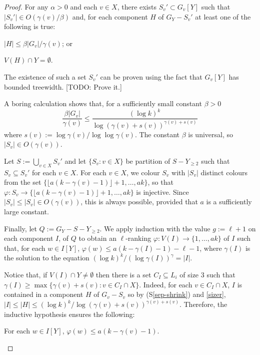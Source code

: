 \documentclass[kpfonts]{patmorin}
\theoremstyle{named}
\begin{document}
\begin{proof}
    For any $\alpha >0$ and each $v\in X$, there exists $S_v'\subset G_v[Y]$ such that $|S_v'|\in O(\gamma(v)/\beta)$ and, for each component $H$ of $G_Y-S_v'$ at least one of the following is true:
    \begin{compactenum}[(S1)]
        \item $|H|\le \beta|G_v|/\gamma(v)$; or \label{sep-shrink}
        \item $V(H)\cap Y=\emptyset$. \label{sep-biggies}
    \end{compactenum}
    The existence of such a set $S_v'$ can be proven using the fact that $G_v[Y]$ has bounded treewidth.  [TODO: Prove it.]

    A boring calculation shows that, for a sufficiently small constant $\beta>0$
    \begin{equation}
        \frac{\beta|G_v|}{\gamma(v)} \le \frac{(\log k)^k}{\log (\gamma(v)+s(v))^{\gamma(v)+s(v)}} \label{sizer}
    \end{equation}
    where $s(v):=\log\gamma(v)/\log\log\gamma(v)$. The constant $\beta$ is universal, so $|S_v|\in O(\gamma(v))$.

    Let $S:=\bigcup_{v\in X} S_v'$ and let $\{S_v: v\in X\}$ be partition of $S-Y_{\ge 2}$ such that $S_v\subseteq S_v'$ for each $v\in X$. For each $v\in X$, we colour $S_v$ with $|S_v|$ distinct colours from the set $\{\lfloor a(k-\gamma(v)-1)\rfloor+1,\ldots,ak\}$, so that $\varphi:S_v\to\{\lfloor a(k-\gamma(v)-1)\rfloor+1,\ldots,ak\}$ is injective.  Since $|S_v|\le |S_v|\in O(\gamma(v))$, this is always possible, provided that $a$ is a sufficiently large constant.

    Finally, let $Q:=G_Y-S-Y_{\ge 2}$.  We apply induction with the value $g:=\ell+1$ on each component $I$, of $Q$ to obtain an $\ell$-ranking $\varphi:V(I)\to\{1,\ldots,ak\}$ of $I$ such that, for each $w\in I[Y]$, $\varphi(w) \le a(k-\gamma(I)-1)-\ell-1$, where $\gamma(I)$ is the solution to the equation $(\log k)^k/(\log\gamma(I))^{\gamma} = |I|$.

    Notice that, if $V(I)\cap Y\neq\emptyset$ then there is a set $C_I\subseteq L_i$ of size 3 such that $\gamma(I)\ge \max\{\gamma(v)+s(v):v\in C_I\cap X\}$. Indeed, for each $v\in C_I\cap X$, $I$ is contained in a component $H$ of $G_v-S_v$ so by (S\ref{sep-shrink}) and \cref{sizer}, $|I|\le|H|\le (\log k)^k/\log (\gamma(v)+s(v))^{\gamma(v)+s(v)}$.  Therefore, the inductive hypothesis ensures the following:
    \begin{compactenum}[(P1)]\setcounter{enumi}{-1}
        \item For each $w\in I[Y]$, $\varphi(w)\le a(k-\gamma(v)-1)$.\label{p-upper-bound}
    \end{compactenum}


\end{proof}
\end{document}
